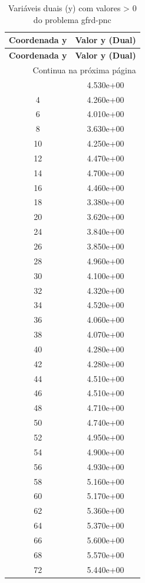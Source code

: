 \documentclass[12pt]{article}
\begin{document}
\begin{longtable}{@{}cc@{}}
\caption{Variáveis duais (y) com valores > 0 do problema gfrd-pnc} \\
\toprule
\textbf{Coordenada y} & \textbf{Valor y (Dual)} \\
\midrule
\endfirsthead

\toprule
\textbf{Coordenada y} & \textbf{Valor y (Dual)} \\
\midrule
\endhead

\midrule \multicolumn{2}{r}{{Continua na próxima página}} \\ \midrule
\endfoot

\bottomrule
\endlastfoot
2 & 4.530e+00 \\
4 & 4.260e+00 \\
6 & 4.010e+00 \\
8 & 3.630e+00 \\
10 & 4.250e+00 \\
12 & 4.470e+00 \\
14 & 4.700e+00 \\
16 & 4.460e+00 \\
18 & 3.380e+00 \\
20 & 3.620e+00 \\
24 & 3.840e+00 \\
26 & 3.850e+00 \\
28 & 4.960e+00 \\
30 & 4.100e+00 \\
32 & 4.320e+00 \\
34 & 4.520e+00 \\
36 & 4.060e+00 \\
38 & 4.070e+00 \\
40 & 4.280e+00 \\
42 & 4.280e+00 \\
44 & 4.510e+00 \\
46 & 4.510e+00 \\
48 & 4.710e+00 \\
50 & 4.740e+00 \\
52 & 4.950e+00 \\
54 & 4.900e+00 \\
56 & 4.930e+00 \\
58 & 5.160e+00 \\
60 & 5.170e+00 \\
62 & 5.360e+00 \\
64 & 5.370e+00 \\
66 & 5.600e+00 \\
68 & 5.570e+00 \\
72 & 5.440e+00 \\

\end{longtable}
\end{document}
